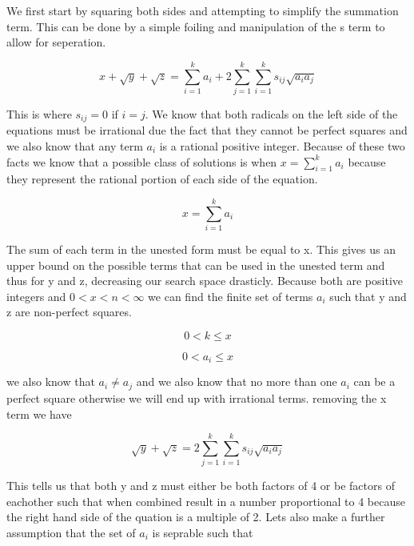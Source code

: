\documentclass[12pt, letterpaper]{article}
\begin{document}
We first start by squaring both sides and attempting to simplify the summation term. This can be done by a simple foiling and manipulation of the s term to allow for seperation.

\begin{equation}
x + \sqrt{y} + \sqrt{z} = \sum_{i=1}^{k} a_{i} + 2\sum_{j=1}^{k}\sum_{i=1}^{k} s_{ij} \sqrt{a_{i}a_{j}}\end{equation}

This is where $s_{ij} = 0$ if $i=j$. We know that both radicals on the left side of the equations must be irrational due the fact that they cannot be perfect squares and we also know that any term $a_{i}$ is a rational positive integer. Because of these two facts we know that a possible class of solutions is when $x =  \sum_{i=1}^{k} a_{i}$ because they represent the rational portion of each side of the equation.

\begin{equation}
x =  \sum_{i=1}^{k} a_{i}
\end{equation}

The sum of each term in the unested form must be equal to x. This gives us an upper bound on the possible terms that can be used in the unested term and thus for y and z, decreasing our search space drasticly. Because both are positive integers and $ 0 < x < n < \infty$ we can find the finite set of terms $a_{i}$ such that y and z are non-perfect squares.


\begin{equation}
0 < k \leq x
\end{equation}

\begin{equation}
0 < a_{i} \leq x
\end{equation}


we also know that $a_{i}  \ne a_{j}$ and we also know that no more than one $a_{i}$ can be a perfect square otherwise we will end up with irrational terms. removing the x term we have


\begin{equation}
\sqrt{y} + \sqrt{z} = 2\sum_{j=1}^{k}\sum_{i=1}^{k} s_{ij} \sqrt{a_{i}a_{j}}
\end{equation}

This tells us that both y and z must either be both factors of 4 or be factors of eachother such that when combined result in a number proportional to 4 because the right hand side of the quation is a multiple of 2. Lets also make a further assumption that the set of $ a_{i} $ is seprable such that
\end{document}
